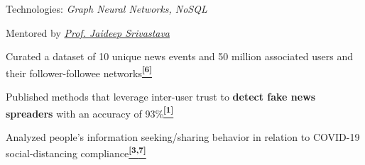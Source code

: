 \vspace{-1.5mm}
\begin{cvskills}
{
\begin{cvitems}
\item[] Technologies: \emph{Graph Neural Networks, NoSQL}
\item[] Mentored by \textit{\href{https://cse.umn.edu/cs/jaideep-srivastava}{Prof. Jaideep Srivastava}}
\item Curated a dataset of 10 unique news events and 50 million associated users and their follower-followee networks\textbf{\bodyfontlight \hyperref[sec:fakenewsconference]{\textsuperscript{[6]}}}
\item Published methods that leverage inter-user trust to {\textbf{\bodyfontlight detect fake news spreaders}} with an accuracy of 93\%\textbf{\bodyfontlight \hyperref[sec:fakenewsjournal]{\textsuperscript{[1]}}}
\item Analyzed people's information seeking/sharing behavior in relation to COVID-19 social-distancing compliance\textbf{\bodyfontlight \hyperref[sec:covidjournal]{\textsuperscript{[3,}}}\textbf{\bodyfontlight \hyperref[sec:icaconferencef]{\textsuperscript{7]}}}
\end{cvitems}
}
\end{cvskills}



